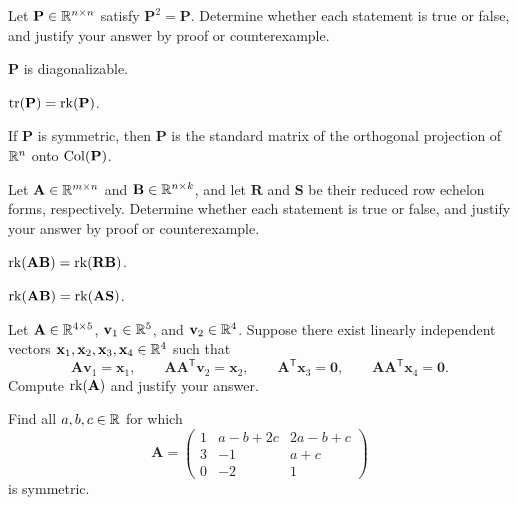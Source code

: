 \documentclass[11pt,oneside]{article}
\begin{document}
\begin{problem}
Let $\mathbf P\in\mathbb{R}^{n\times n}$ satisfy $\mathbf P^2=\mathbf P$. Determine whether each statement is true or false, and justify your answer by proof or counterexample.
\begin{problemsubparts}
\item $\mathbf P$ is diagonalizable.
\item $\operatorname{tr}(\mathbf P)=\operatorname{rk}(\mathbf P)$.
\item If $\mathbf P$ is symmetric, then $\mathbf P$ is the standard matrix of the orthogonal projection of $\mathbb{R}^n$ onto $\operatorname{Col}(\mathbf P)$.
\end{problemsubparts}
\end{problem}

\begin{problem}
Let $\mathbf A\in\mathbb{R}^{m\times n}$ and $\mathbf B\in\mathbb{R}^{n\times k}$, and let $\mathbf R$ and $\mathbf S$ be their reduced row echelon forms, respectively. Determine whether each statement is true or false, and justify your answer by proof or counterexample.
\begin{problemsubparts}
\item $\operatorname{rk}(\mathbf A\mathbf B)=\operatorname{rk}(\mathbf R\mathbf B)$.
\item $\operatorname{rk}(\mathbf A\mathbf B)=\operatorname{rk}(\mathbf A\mathbf S)$.
\end{problemsubparts}
\end{problem}

\begin{problem}
Let $\mathbf A\in\mathbb{R}^{4\times5}$, $\mathbf v_1\in\mathbb{R}^5$, and $\mathbf v_2\in\mathbb{R}^4$. Suppose there exist linearly independent vectors $\mathbf x_1,\mathbf x_2,\mathbf x_3,\mathbf x_4\in\mathbb{R}^4$ such that
\[
\mathbf A\mathbf v_1=\mathbf x_1,
\qquad
\mathbf A\mathbf A^{\mathsf T}\mathbf v_2=\mathbf x_2,
\qquad
\mathbf A^{\mathsf T}\mathbf x_3=\mathbf 0,
\qquad
\mathbf A\mathbf A^{\mathsf T}\mathbf x_4=\mathbf 0.
\]
Compute $\operatorname{rk}(\mathbf A)$ and justify your answer.
\end{problem}

\begin{problem}
Find all $a,b,c\in\mathbb{R}$ for which
\[
\mathbf A=
\begin{pmatrix}
1&a-b+2c&2a-b+c\\
3&-1&a+c\\
0&-2&1
\end{pmatrix}
\]
is symmetric.
\end{problem}
\end{document}
